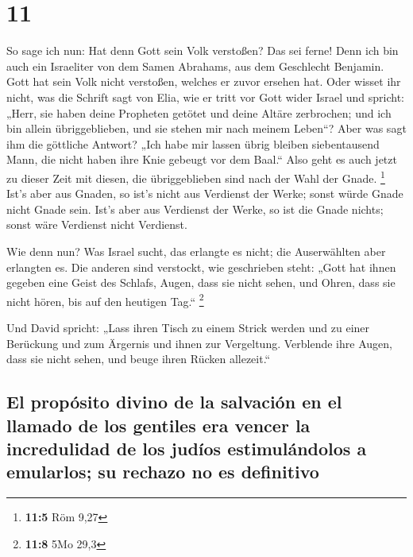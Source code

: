 \hypertarget{section-10}{%
\section{11}\label{section-10}}

 So sage ich nun: Hat denn Gott sein Volk verstoßen? Das
sei ferne! Denn ich bin auch ein Israeliter von dem Samen Abrahams, aus
dem Geschlecht Benjamin.  Gott hat sein Volk nicht
verstoßen, welches er zuvor ersehen hat. Oder wisset ihr nicht, was die
Schrift sagt von Elia, wie er tritt vor Gott wider Israel und spricht:
 „Herr, sie haben deine Propheten getötet und deine Altäre
zerbrochen; und ich bin allein übriggeblieben, und sie stehen mir nach
meinem Leben``?  Aber was sagt ihm die göttliche Antwort?
„Ich habe mir lassen übrig bleiben siebentausend Mann, die nicht haben
ihre Knie gebeugt vor dem Baal.``  Also geht es auch jetzt
zu dieser Zeit mit diesen, die übriggeblieben sind nach der Wahl der
Gnade. \footnote{\textbf{11:5} Röm 9,27}  Ist's aber aus
Gnaden, so ist's nicht aus Verdienst der Werke; sonst würde Gnade nicht
Gnade sein. Ist's aber aus Verdienst der Werke, so ist die Gnade nichts;
sonst wäre Verdienst nicht Verdienst.

 Wie denn nun? Was Israel sucht, das erlangte es nicht;
die Auserwählten aber erlangten es. Die anderen sind verstockt,
 wie geschrieben steht: „Gott hat ihnen gegeben eine Geist
des Schlafs, Augen, dass sie nicht sehen, und Ohren, dass sie nicht
hören, bis auf den heutigen Tag.`` \footnote{\textbf{11:8} 5Mo 29,3}

 Und David spricht: „Lass ihren Tisch zu einem Strick
werden und zu einer Berückung und zum Ärgernis und ihnen zur Vergeltung.
 Verblende ihre Augen, dass sie nicht sehen, und beuge
ihren Rücken allezeit.``

\hypertarget{el-propuxf3sito-divino-de-la-salvaciuxf3n-en-el-llamado-de-los-gentiles-era-vencer-la-incredulidad-de-los-juduxedos-estimuluxe1ndolos-a-emularlos-su-rechazo-no-es-definitivo}{%
\subsection{El propósito divino de la salvación en el llamado de los
gentiles era vencer la incredulidad de los judíos estimulándolos a
emularlos; su rechazo no es
definitivo}\label{el-propuxf3sito-divino-de-la-salvaciuxf3n-en-el-llamado-de-los-gentiles-era-vencer-la-incredulidad-de-los-juduxedos-estimuluxe1ndolos-a-emularlos-su-rechazo-no-es-definitivo}}

